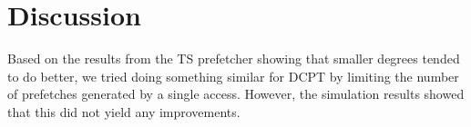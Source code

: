 \section{Discussion}

Based on the results from the TS prefetcher showing that
smaller degrees tended to do better, we tried doing something similar for
DCPT by limiting the number of prefetches generated by a single access.
However, the simulation results showed that this did not yield any
improvements.

